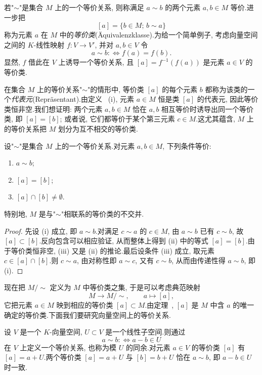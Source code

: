 若"$\sim$"是集合 $M$ 上的一个等价关系, 则称满足 $a \sim b$ 的两个元素 $a, b \in M$ 等价.进一步把
\[
[a] = \{b \in M;\, b \sim a\}
\]
称为元素 $a$ 在 $M$ 中的\emph{等价类}(\textup{Äquivalenzklasse}).为给一个简单例子, 考虑向量空间之间的 $K$-线性映射 $f \colon V \longrightarrow V'$, 并对 $a, b \in V$ 令
\[
a \sim b :\Longleftrightarrow f(a) = f(b)\text{.}
\]
显然, $f$ 借此在 $V$ 上诱导一个等价关系, 且 $[a] = f^{-1}(f(a))$ 是元素 $a \in V$ 的等价类.

在集合 $M$ 上的等价关系"$\sim$"的情形中, 等价类 $[a]$ 的每个元素 $b$ 都称为该类的一个\emph{代表元}(\textup{Repräsentant}).由定义~ (i), 元素 $a \in M$ 恒是类 $[a]$ 的代表元, 因此等价类恒非空.我们想证明: 两个元素 $a, b \in M$ 恰在 $a, b$ 相互等价时诱导出同一个等价类, 即 $[a] = [b]$; 或者说, 它们都等价于某个第三元素 $c \in M$.这尤其蕴含, $M$ 上的等价关系把 $M$ 划分为互不相交的等价类.

\begin{theorem}\label{thm:2.2.4}
设"$\sim$"是集合 $M$ 上的一个等价关系.对元素 $a, b \in M$, 下列条件等价:
\begin{enumerate}
\item[(i)] $a \sim b$;
\item[(ii)] $[a] = [b]$;
\item[(iii)] $[a] \cap [b] \neq \emptyset$.
\end{enumerate}
特别地, $M$ 是与"$\sim$"相联系的等价类的不交并.
\end{theorem}

\begin{proof}
先设 (i) 成立, 即 $a \sim b$.对满足 $c \sim a$ 的 $c \in M$, 由 $a \sim b$ 已有 $c \sim b$, 故 $[a] \subset [b]$.反向包含可以相应验证, 从而整体上得到 (ii) 中的等式 $[a] = [b]$.由于等价类恒非空, (iii) 又是 (ii) 的推论.最后设条件 (iii) 成立, 取元素 $c \in [a] \cap [b]$.则 $c \sim a$, 由对称性即 $a \sim c$, 又有 $c \sim b$, 从而由传递性得 $a \sim b$, 即 (i).
\end{proof}

现在把 $M / \sim$ 定义为 $M$ 中等价类之集, 于是可以考虑典范映射
\[
M \longrightarrow M / \sim, \qquad a \longmapsto [a],
\]
它把元素 $a \in M$ 映到相应的等价类 $[a] \subset M$.由定理~, $[a]$ 是 $M$ 中含 $a$ 的唯一确定的等价类.下面我们要研究向量空间上的等价关系.

\begin{remark}\label{rem:2.2.5}
设 $V$ 是一个 $K$-向量空间, $U \subset V$ 是一个线性子空间.则通过
\[
a \sim b :\Longleftrightarrow a - b \in U
\]
在 $V$ 上定义一个等价关系, 也称为模 $U$ 的同余.对元素 $a \in V$ 的等价类 $[a]$ 有 $[a] = a + U$.两个等价类 $[a] = a + U$ 与 $[b] = b + U$ 恰在 $a \sim b$, 即 $a - b \in U$ 时一致.
\end{remark}

